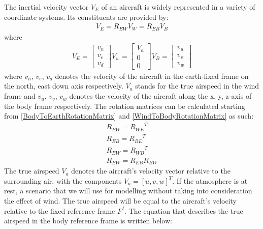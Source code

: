 \documentclass[twocolumn,showpacs,
    nofootinbib,aps,superscriptaddress,
    eqsecnum,prd,showkeys,10pt,floatfix]{revtex4}
\begin{document}
\par
The inertial velocity vector $V_E$ of an aircraft is widely represented in a
variety of coordinate systems. Its constituents are provided by:
\begin{align}
    {V_E}={R_{EW}V_W}={R_{EB}V_B}
    \label{VelocityRotationEquation}
\end{align}
where
\begin{align}
    {{V_E}=\begin{bmatrix}
                   v_n \\
                   v_e \\
                   v_d
               \end{bmatrix}}
    {{V_w}=\begin{bmatrix}
                   V_a \\
                   0   \\
                   0
               \end{bmatrix}}
    {{V_B}=\begin{bmatrix}
                   v_u \\
                   v_v \\
                   v_w
               \end{bmatrix}}
    \label{TrueAirspeed}
\end{align}
where $v_n$, $v_e$, $v_d$ denotes the velocity of the aircraft in the earth-fixed frame on the north, east down axis respectively. $V_a$ stands for the true airspeed in the wind frame and $v_u$, $v_v$, $v_w$
denotes the velocity of the aircraft along the x, y, z-axis of the body frame respectively. The rotation matrices can be calculated starting from {\ref{BodyToEarthRotationMatrix}} and {\ref{WindToBodyRotationMatrix}} as such:
\begin{align}
    {R_{EW}}={R_{WE}}^T \\
    {R_{EB}}={R_{BE}}^T \\
    {R_{BW}}={R_{WB}}^T \\
    {R_{EW}}={R_{EB}R_{BW}}
    \label{MatrixRotationEquation}
\end{align}
The true airspeed $V_a$ denotes the aircraft's velocity vector relative to the surrounding air, with the components $V_a={[u,v,w]}^T$.
If the atmosphere is at rest, a scenario that we will use for modelling without taking into consideration the effect of wind. The true airspeed will be equal to the aircraft's velocity relative to the fixed reference frame $F^I$.
The equation that describes the true airspeed in the body reference frame is written below:
\end{document}
